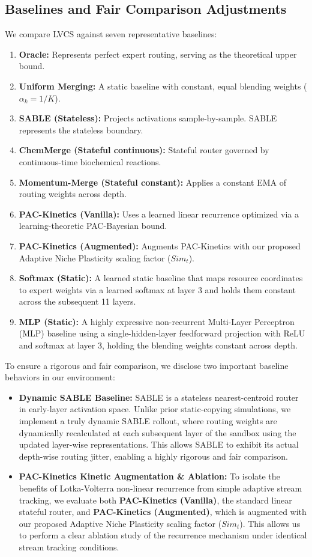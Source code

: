 \subsection{Baselines and Fair Comparison Adjustments}
We compare LVCS against seven representative baselines:
\begin{enumerate}
    \item \textbf{Oracle:} Represents perfect expert routing, serving as the theoretical upper bound.
    \item \textbf{Uniform Merging:} A static baseline with constant, equal blending weights ($\alpha_k = 1/K$).
    \item \textbf{SABLE (Stateless):} Projects activations sample-by-sample. SABLE represents the stateless boundary.
    \item \textbf{ChemMerge (Stateful continuous):} Stateful router governed by continuous-time biochemical reactions.
    \item \textbf{Momentum-Merge (Stateful constant):} Applies a constant EMA of routing weights across depth.
    \item \textbf{PAC-Kinetics (Vanilla):} Uses a learned linear recurrence optimized via a learning-theoretic PAC-Bayesian bound.
    \item \textbf{PAC-Kinetics (Augmented):} Augments PAC-Kinetics with our proposed Adaptive Niche Plasticity scaling factor ($Sim_t$).
    \item \textbf{Softmax (Static):} A learned static baseline that maps resource coordinates to expert weights via a learned softmax at layer 3 and holds them constant across the subsequent 11 layers.
    \item \textbf{MLP (Static):} A highly expressive non-recurrent Multi-Layer Perceptron (MLP) baseline using a single-hidden-layer feedforward projection with ReLU and softmax at layer 3, holding the blending weights constant across depth.
\end{enumerate}

To ensure a rigorous and fair comparison, we disclose two important baseline behaviors in our environment:
\begin{itemize}
    \item \textbf{Dynamic SABLE Baseline:} SABLE is a stateless nearest-centroid router in early-layer activation space. Unlike prior static-copying simulations, we implement a truly dynamic SABLE rollout, where routing weights are dynamically recalculated at each subsequent layer of the sandbox using the updated layer-wise representations. This allows SABLE to exhibit its actual depth-wise routing jitter, enabling a highly rigorous and fair comparison.
    \item \textbf{PAC-Kinetics Kinetic Augmentation \& Ablation:} To isolate the benefits of Lotka-Volterra non-linear recurrence from simple adaptive stream tracking, we evaluate both \textbf{PAC-Kinetics (Vanilla)}, the standard linear stateful router, and \textbf{PAC-Kinetics (Augmented)}, which is augmented with our proposed Adaptive Niche Plasticity scaling factor ($Sim_t$). This allows us to perform a clear ablation study of the recurrence mechanism under identical stream tracking conditions.
\end{itemize}


